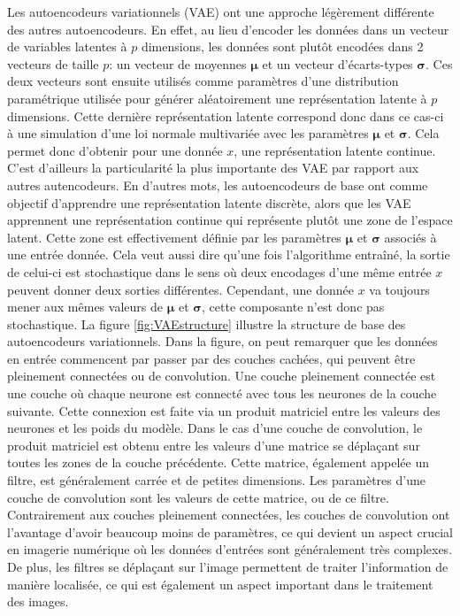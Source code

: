 Les autoencodeurs variationnels (VAE)  \cite{kingma2013autoencoding} ont une approche légèrement différente des autres autoencodeurs. En effet, au lieu d'encoder les données dans un vecteur de variables latentes à $p$ dimensions, les données sont plutôt encodées dans 2 vecteurs de taille $p$: un vecteur de moyennes $\boldsymbol \mu$ et un vecteur d'écarts-types $\boldsymbol \sigma$. Ces deux vecteurs sont ensuite utilisés comme paramètres d'une distribution paramétrique utilisée pour générer aléatoirement une représentation latente à $p$ dimensions. Cette dernière représentation latente correspond donc dans ce cas-ci à une simulation d'une loi normale multivariée avec les paramètres $\boldsymbol \mu$ et $\boldsymbol \sigma$. Cela permet donc d'obtenir pour une donnée $x$, une représentation latente continue. C'est d'ailleurs la particularité la plus importante des VAE par rapport aux autres autencodeurs. En d'autres mots, les autoencodeurs de base ont comme objectif d'apprendre une représentation latente discrète, alors que les VAE apprennent une représentation continue qui représente plutôt une zone de l'espace latent. Cette zone est effectivement définie par les paramètres $\boldsymbol \mu$ et $\boldsymbol \sigma$ associés à une entrée donnée. Cela veut aussi dire qu'une fois l'algorithme entraîné, la sortie de celui-ci est stochastique dans le sens où deux encodages d'une même entrée $x$ peuvent donner deux sorties différentes. Cependant, une donnée $x$ va toujours mener aux mêmes valeurs de $\boldsymbol \mu$ et $\boldsymbol \sigma$, cette composante n'est donc pas stochastique. La figure \ref{fig:VAEstructure} illustre la structure de base des autoencodeurs variationnels. Dans la figure, on peut remarquer que les données en entrée commencent par passer par des couches cachées, qui peuvent être pleinement connectées ou de convolution. Une couche pleinement connectée est une couche où chaque neurone est connecté avec tous les neurones de la couche suivante. Cette connexion est faite via un produit matriciel entre les valeurs des neurones et les poids du modèle. Dans le cas d'une couche de convolution, le produit matriciel est obtenu entre les valeurs d'une matrice se déplaçant sur toutes les zones de la couche précédente. Cette matrice, également appelée un filtre, est généralement carrée et de petites dimensions. Les paramètres d'une couche de convolution sont les valeurs de cette matrice, ou de ce filtre. Contrairement aux couches pleinement connectées, les couches de convolution ont l'avantage d'avoir beaucoup moins de paramètres, ce qui devient un aspect crucial en imagerie numérique où les données d'entrées sont généralement très complexes. De plus, les filtres se déplaçant sur l'image permettent de traiter l'information de manière localisée, ce qui est également un aspect important dans le traitement des images.


